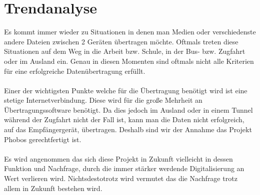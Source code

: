 \section{Trendanalyse}
Es kommt immer wieder zu Situationen in denen man Medien oder verschiedenste andere Dateien zwischen 2 Geräten übertragen möchte. Oftmals treten diese Situationen auf dem Weg in die Arbeit bzw. Schule, in der Bus- bzw. Zugfahrt oder im Ausland ein. Genau in diesen Momenten sind oftmals nicht alle Kriterien für eine erfolgreiche Datenübertragung erfüllt.
\\\\
 Einer der wichtigsten Punkte welche für die Übertragung benötigt wird ist eine stetige Internetverbindung. Diese wird für die große Mehrheit an Übertragungssoftware benötigt. Da dies jedoch im Ausland oder in einem Tunnel während der Zugfahrt nicht der Fall ist, kann man die Daten nicht erfolgreich, auf das Empfängergerät, übertragen. Deshalb sind wir der Annahme das Projekt Phobos gerechtfertigt ist.
\\\\
Es wird angenommen das sich diese Projekt in Zukunft vielleicht in dessen Funktion und Nachfrage, durch die immer stärker werdende Digitalisierung an Wert verlieren wird. Nichtsdestotrotz wird vermutet das die Nachfrage trotz allem in Zukunft bestehen wird.